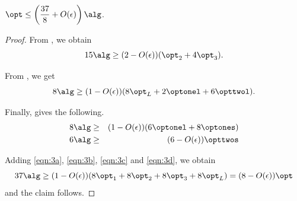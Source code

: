 \begin{claim}
\label{cla:37by8}
    $\displaystyle\opt \le \left(\frac{37}{8}+O(\epsilon)\right)\alg$.
\end{claim}
\begin{proof}
    From , we obtain
    \begin{equation}
    \label{eqn:3a}
        15\alg \ge (2-O(\epsilon))(\opt_2+4\opt_3).
    \end{equation}

    From , we get
    \begin{equation}
    \label{eqn:3b}
        8\alg \ge (1-O(\epsilon))(8\opt_L + 2\optonel + 6\opttwol).
    \end{equation}

    Finally,  gives the following.
    \begin{eqnarray}
        8\alg &\ge& (1-O(\epsilon))(6\optonel + 8\optones)  \label{eqn:3c}\\
        6\alg &\ge& (6-O(\epsilon))\opttwos  \label{eqn:3d}
    \end{eqnarray}

    Adding \eqref{eqn:3a}, \eqref{eqn:3b}, \eqref{eqn:3c} and \eqref{eqn:3d}, we obtain
    \[ 37\alg \ge (1-O(\epsilon))(8\opt_1 + 8\opt_2 + 8\opt_3 + 8\opt_L) = (8-O(\epsilon))\opt\]
    and the claim follows.
\end{proof}











